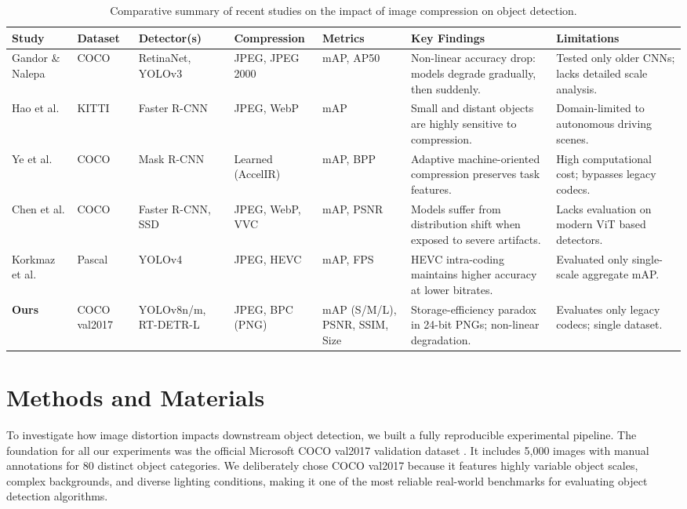 \documentclass[12pt, a4paper]{article}
\begin{document}
\begin{table}[ht]
\centering
\small
\caption{Comparative summary of recent studies on the impact of image compression on object detection.}
\label{tab:lit_review}
\begin{tabularx}{\textwidth}{@{} 
    p{1.2cm} %
    p{1.0cm} %
    p{1.5cm} %
    p{1.9cm} %
    p{1.2cm} %
    X        
    X @{}}   
\toprule
\textbf{Study} & \textbf{Dataset} & \textbf{Detector(s)} & \textbf{Compression} & \textbf{Metrics} & \textbf{Key Findings} & \textbf{Limitations} \\ \midrule

Gandor \& Nalepa \cite{gandor2022} & COCO & RetinaNet, YOLOv3 & JPEG, JPEG 2000 & mAP, AP50 & Non-linear accuracy drop: models degrade gradually, then suddenly. & Tested only older CNNs; lacks detailed scale analysis. \\ \addlinespace

Hao et al. \cite{hao2022} & KITTI & Faster R-CNN & JPEG, WebP & mAP & Small and distant objects are highly sensitive to compression. & Domain-limited to autonomous driving scenes. \\ \addlinespace

Ye et al. \cite{ye2023} & COCO & Mask R-CNN & Learned (AccelIR) & mAP, BPP & Adaptive machine-oriented compression preserves task features. & High computational cost; bypasses legacy codecs. \\ \addlinespace

Chen et al. \cite{chen2023} & COCO & Faster R-CNN, SSD & JPEG, WebP, VVC & mAP, PSNR & Models suffer from distribution shift when exposed to severe artifacts. & Lacks evaluation on modern ViT based detectors. \\ \addlinespace

Korkmaz et al. \cite{korkmaz2021} & Pascal & YOLOv4 & JPEG, HEVC & mAP, FPS & HEVC intra-coding maintains higher accuracy at lower bitrates. & Evaluated only single-scale aggregate mAP. \\ \midrule

\textbf{Ours} & COCO val2017 & YOLOv8n/m, RT-DETR-L & JPEG, BPC (PNG) & mAP (S/M/L), PSNR, SSIM, Size & Storage-efficiency paradox in 24-bit PNGs; non-linear degradation. & Evaluates only legacy codecs; single dataset. \\ \bottomrule
\end{tabularx}
\end{table}


\section{Methods and Materials}
To investigate how image distortion impacts downstream object detection, we built a fully reproducible experimental pipeline. The foundation for all our experiments was the official Microsoft COCO val2017 validation dataset \cite{lin2014}. It includes 5,000 images with manual annotations for 80 distinct object categories. We deliberately chose COCO val2017 because it features highly variable object scales, complex backgrounds, and diverse lighting conditions, making it one of the most reliable real-world benchmarks for evaluating object detection algorithms.
\end{document}
